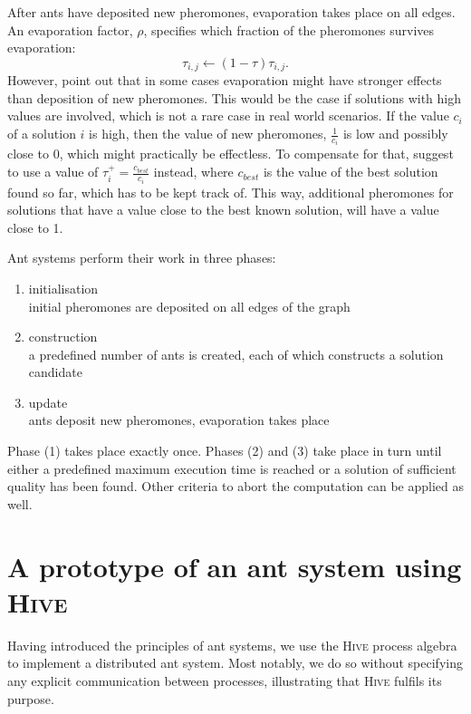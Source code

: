 After ants have deposited new pheromones, evaporation takes place on all edges. An evaporation factor, $\rho$, specifies which fraction of the pheromones survives evaporation:
\begin{equation}
  \label{eqn:evaporation}
  \tau_{i,j} \leftarrow \left( 1 - \tau \right) \tau_{i,j}.
\end{equation}
However, \cite{Bloecker} point out that in some cases evaporation might have stronger effects than deposition of new pheromones. This would be the case if solutions with high values are involved, which is not a rare case in real world scenarios. If the value $c_i$ of a solution $i$ is high, then the value of new pheromones, $\frac{1}{c_i}$ is low and possibly close to $0$, which might practically be effectless. To compensate for that, \cite{Bloecker} suggest to use a value of $\tau_i^+ = \frac{c_{best}}{c_i}$ instead, where $c_{best}$ is the value of the best solution found so far, which has to be kept track of. This way, additional pheromones for solutions that have a value close to the best known solution, will have a value close to 1.

Ant systems perform their work in three phases:
\begin{enumerate}
  \item initialisation \\
    initial pheromones are deposited on all edges of the graph
  \item construction \\
    a predefined number of ants is created, each of which constructs a solution candidate
  \item update \\
    ants deposit new pheromones, evaporation takes place
\end{enumerate}
Phase (1) takes place exactly once. Phases (2) and (3) take place in turn until either a predefined maximum execution time is reached or a solution of sufficient quality has been found. Other criteria to abort the computation can be applied as well.

\section{A prototype of an ant system using \textsc{Hive}}
Having introduced the principles of ant systems, we use the \textsc{Hive} process algebra to implement a distributed ant system. Most notably, we do so without specifying any explicit communication between processes, illustrating that \textsc{Hive} fulfils its purpose.

